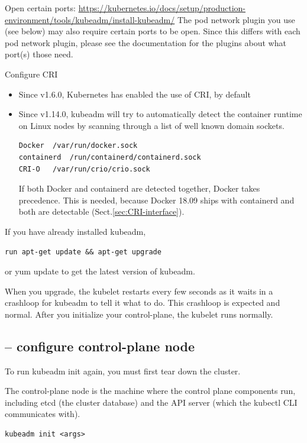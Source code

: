 Open certain ports:
\url{https://kubernetes.io/docs/setup/production-environment/tools/kubeadm/install-kubeadm/}
The pod network plugin you use (see below) may also require certain ports to be
open. Since this differs with each pod network plugin, please see the
documentation for the plugins about what port(s) those need.


Configure CRI
\begin{itemize}
  \item  Since v1.6.0, Kubernetes has enabled the use of CRI, by default
  
  
  \item Since v1.14.0, kubeadm will try to automatically detect the container
  runtime on Linux nodes by scanning through a list of well known domain
  sockets.
\begin{verbatim}
Docker	/var/run/docker.sock
containerd	/run/containerd/containerd.sock
CRI-O	/var/run/crio/crio.sock
\end{verbatim}

If both Docker and containerd are detected together, Docker takes precedence.
This is needed, because Docker 18.09 ships with containerd and both are
detectable (Sect.\ref{sec:CRI-interface}).

\end{itemize}

If you have already installed kubeadm,
\begin{verbatim}
run apt-get update && apt-get upgrade
\end{verbatim} or
yum update to get the latest version of kubeadm.

When you upgrade, the kubelet restarts every few seconds as it waits in a
crashloop for kubeadm to tell it what to do. This crashloop is expected and
normal. After you initialize your control-plane, the kubelet runs normally.

\subsection{-- configure control-plane node}


To run kubeadm init again, you must first tear down the cluster.

The control-plane node is the machine where the control plane components run,
including etcd (the cluster database) and the API server (which the kubectl CLI
communicates with).
\begin{verbatim}
kubeadm init <args>
\end{verbatim}



